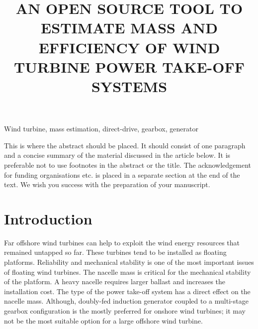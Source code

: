 \documentclass{article}\usepackage{graphicx, color}
\begin{document}
\title{AN OPEN SOURCE TOOL TO ESTIMATE MASS AND EFFICIENCY OF WIND TURBINE POWER TAKE-OFF SYSTEMS}


\maketitle

\keywords
Wind turbine, mass estimation, direct-drive, gearbox, generator

\abstract
This is where the abstract should be placed. It should
consist of one paragraph and a concise summary of the
material discussed in the article below. It is preferable not
to use footnotes in the abstract or the title. The
acknowledgement for funding organisations etc. is placed
in a separate section at the end of the text. We wish you
success with the preparation of your manuscript.

\section{Introduction}

Far offshore wind turbines can help to exploit the wind energy resources that remained untapped so far. These turbines tend to be installed as floating platforms. Reliability and mechanical stability is one of the most important issues of floating wind turbines. The nacelle mass is critical for the mechanical stability of the platform. A heavy nacelle requires larger ballast and increases the installation cost. The type of the power take-off system has a direct effect on the nacelle mass. Although, doubly-fed induction generator coupled to a multi-stage gearbox configuration is the mostly preferred for onshore wind turbines; it may not be the most suitable option for a large offshore wind turbine.
\end{document}
